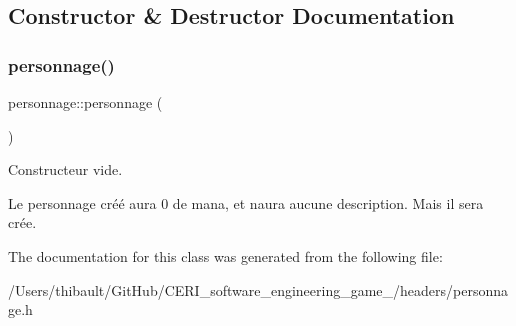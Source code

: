 \subsection{Constructor \& Destructor Documentation}
\mbox{\label{classpersonnage_acd9ca516f8c5c110687e5167dab8db59}} 
\subsubsection{\texorpdfstring{personnage()}{personnage()}}
{\footnotesize\ttfamily personnage\+::personnage (\begin{DoxyParamCaption}{ }\end{DoxyParamCaption})\hspace{0.3cm}{\ttfamily [inline]}}



Constructeur vide. 

Le personnage créé aura 0 de mana, et n\textquotesingle{}aura aucune description. Mais il sera crée. 

The documentation for this class was generated from the following file\+:\begin{DoxyCompactItemize}
\item 
/\+Users/thibault/\+Git\+Hub/\+C\+E\+R\+I\+\_\+software\+\_\+engineering\+\_\+game\+\_/headers/personnage.\+h\end{DoxyCompactItemize}
